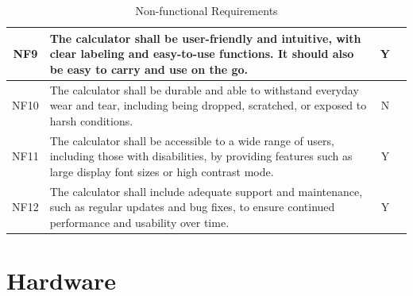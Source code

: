 \documentclass[a4paper, twoside]{report}
\begin{document}
\begin{table}[H]
\begin{tabular}{|c{}|p{}|c{}|c{}|}
NF9  & The calculator shall be user-friendly and intuitive, with clear labeling and easy-to-use functions. It should also be easy to carry and use on the go.                        & Y &                         \\ \hline
NF10 & The calculator shall be durable and able to withstand everyday wear and tear, including being dropped, scratched, or exposed to harsh conditions.                             & N &                         \\ \hline
NF11 & The calculator shall be accessible to a wide range of users, including those with disabilities, by providing features such as large display font sizes or high contrast mode. & Y &                         \\ \hline
NF12 & The calculator shall include adequate support and maintenance, such as regular updates and bug fixes, to ensure continued performance and usability over time.                & Y &                         \\ \hline
\end{tabular}
\caption{Non-functional Requirements}
\end{table}

\chapter{Hardware}
\end{document}
